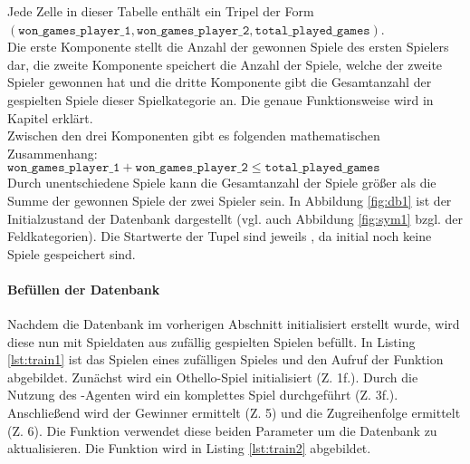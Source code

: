 Jede Zelle in dieser Tabelle enthält ein Tripel der Form \\$( \mathtt{won\_games\_player\_1}, \mathtt{won\_games\_player\_2}, \mathtt{total\_played\_games})$. 
\\Die erste Komponente stellt die Anzahl der gewonnen Spiele des ersten Spielers dar, die zweite Komponente speichert die Anzahl der Spiele, welche der zweite Spieler gewonnen hat und die dritte Komponente gibt die Gesamtanzahl der gespielten Spiele dieser Spielkategorie an. Die genaue Funktionsweise wird in Kapitel  erklärt.
\\Zwischen den drei Komponenten gibt es folgenden mathematischen Zusammenhang: 
\\$\mathtt{won\_games\_player\_1} + \mathtt{won\_games\_player\_2} \le \mathtt{total\_played\_games}$
\\Durch unentschiedene Spiele kann die Gesamtanzahl der Spiele größer als die Summe der gewonnen Spiele der zwei Spieler sein.
In Abbildung \ref{fig:db1} ist der Initialzustand der Datenbank dargestellt (vgl. auch Abbildung \ref{fig:sym1} bzgl. der Feldkategorien). Die Startwerte der Tupel sind jeweils , da initial noch keine Spiele gespeichert sind.
\\

\paragraph{Befüllen der Datenbank}
\label{para:train1}
Nachdem die Datenbank im vorherigen Abschnitt initialisiert erstellt wurde, wird diese nun mit Spieldaten aus zufällig gespielten Spielen befüllt. In Listing \ref{lst:train1} ist das Spielen eines zufälligen Spieles und den Aufruf der Funktion  abgebildet. Zunächst wird ein Othello-Spiel initialisiert (Z. 1f.). Durch die Nutzung des -Agenten wird ein komplettes Spiel durchgeführt (Z. 3f.). Anschließend wird der Gewinner ermittelt (Z. 5) und die Zugreihenfolge ermittelt (Z. 6). Die Funktion  verwendet diese beiden Parameter um die Datenbank zu aktualisieren. Die Funktion wird in Listing \ref{lst:train2} abgebildet.

